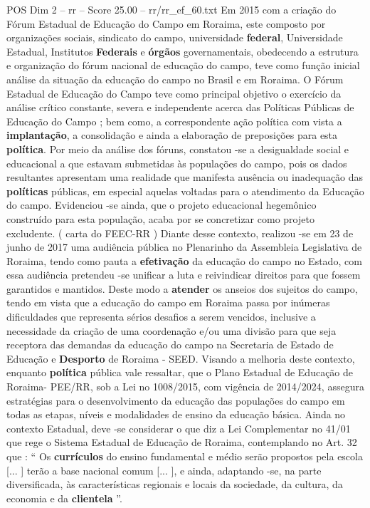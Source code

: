 \begin{textsample}{POS Dim 2 – rr – Score 25.00 – rr/rr\_ef\_60.txt}
Em 2015 com a criação do Fórum Estadual de Educação do Campo em Roraima, este composto por organizações sociais, sindicato do campo, universidade \textbf{federal}, Universidade Estadual, Institutos \textbf{Federais} e \textbf{órgãos} governamentais, obedecendo a estrutura e organização do fórum nacional de educação do campo, teve como função inicial análise da situação da educação do campo no Brasil e em Roraima.
O Fórum Estadual de Educação do Campo teve como principal objetivo o exercício da análise crítico constante, severa e independente acerca das Políticas Públicas de Educação do Campo ; bem como, a correspondente ação política com vista a \textbf{implantação}, a consolidação e ainda a elaboração de preposições para esta \textbf{política}.
Por meio da análise dos fóruns, constatou -se a desigualdade social e educacional a que estavam submetidas às populações do campo, pois os dados resultantes apresentam uma realidade que manifesta ausência ou inadequação das \textbf{políticas} públicas, em especial aquelas voltadas para o atendimento da Educação do campo.
Evidenciou -se ainda, que o projeto educacional hegemônico construído para esta população, acaba por se concretizar como projeto excludente. ( carta do FEEC-RR ) Diante desse contexto, realizou -se em 23 de junho de 2017 uma audiência pública no Plenarinho da Assembleia Legislativa de Roraima, tendo como pauta a \textbf{efetivação} da educação do campo no Estado, com essa audiência pretendeu -se unificar a luta e reivindicar direitos para que fossem garantidos e mantidos.
Deste modo a \textbf{atender} os anseios dos sujeitos do campo, tendo em vista que a educação do campo em Roraima passa por inúmeras dificuldades que representa sérios desafios a serem vencidos, inclusive a necessidade da criação de uma coordenação e/ou uma divisão para que seja receptora das demandas da educação do campo na Secretaria de Estado de Educação e \textbf{Desporto} de Roraima - SEED.
Visando a melhoria deste contexto, enquanto \textbf{política} pública vale ressaltar, que o Plano Estadual de Educação de Roraima- PEE/RR, sob a Lei no 1008/2015, com vigência de 2014/2024, assegura estratégias para o desenvolvimento da educação das populações do campo em todas as etapas, níveis e modalidades de ensino da educação básica.
Ainda no contexto Estadual, deve -se considerar o que diz a Lei Complementar no 41/01 que rege o Sistema Estadual de Educação de Roraima, contemplando no Art. 32 que : “ Os \textbf{currículos} do ensino fundamental e médio serão propostos pela escola [... ] terão a base nacional comum [... ], e ainda, adaptando -se, na parte diversificada, às características regionais e locais da sociedade, da cultura, da economia e da \textbf{clientela} ”.

\end{textsample}
